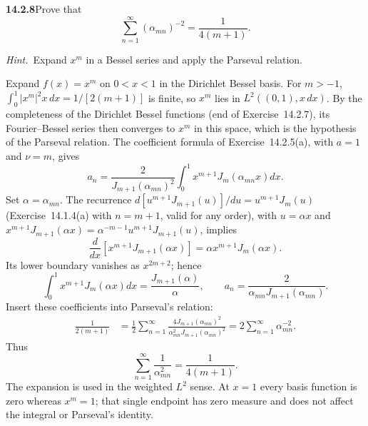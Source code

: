 \par\bigskip
\noindent\textbf{14.2.8}\quad Prove that
\[
\sum_{n=1}^{\infty}(\alpha_{mn})^{-2}=\frac{1}{4(m+1)}.
\]
\par\emph{Hint.}~Expand $x^{m}$ in a Bessel series and apply the
Parseval relation.
\par{}
\solution
Expand $f(x)=x^m$ on $0<x<1$ in the Dirichlet Bessel basis.
For $m>-1$, $\int_0^1|x^m|^2x\,dx=1/[2(m+1)]$ is finite, so $x^m$
lies in $L^2((0,1),x\,dx)$. By the completeness of the Dirichlet
Bessel functions (end of Exercise~14.2.7), its Fourier--Bessel series
then converges to $x^m$ in this space, which is the hypothesis of the
Parseval relation.
The coefficient formula of Exercise~14.2.5(a), with $a=1$ and
$\nu=m$, gives
\[
a_n=\frac{2}{J_{m+1}(\alpha_{mn})^2}
\int_0^1x^{m+1}J_m(\alpha_{mn}x)dx.
\]
Set $\alpha=\alpha_{mn}$. The recurrence
$d[u^{m+1}J_{m+1}(u)]/du=u^{m+1}J_m(u)$ (Exercise~14.1.4(a) with
$n=m+1$, valid for any order), with $u=\alpha x$ and
$x^{m+1}J_{m+1}(\alpha x)=\alpha^{-m-1}u^{m+1}J_{m+1}(u)$, implies
\[
\frac d{dx}[x^{m+1}J_{m+1}(\alpha x)]
=\alpha x^{m+1}J_m(\alpha x).
\]
Its lower boundary vanishes as $x^{2m+2}$; hence
\[
\int_0^1x^{m+1}J_m(\alpha x)dx
=\frac{J_{m+1}(\alpha)}\alpha,
\qquad a_n=\frac{2}{\alpha_{mn}J_{m+1}(\alpha_{mn})}.
\]
Insert these coefficients into Parseval's relation:
\begin{align*}
\frac1{2(m+1)}
&=\frac12\sum_{n=1}^{\infty}
\frac{4J_{m+1}(\alpha_{mn})^2}
{\alpha_{mn}^2J_{m+1}(\alpha_{mn})^2}
=2\sum_{n=1}^{\infty}\alpha_{mn}^{-2}.
\end{align*}
Thus
\[
\boxed{\sum_{n=1}^{\infty}\frac1{\alpha_{mn}^2}
=\frac1{4(m+1)}}.
\]
The expansion is used in the weighted $L^2$ sense. At $x=1$ every
basis function is zero whereas $x^m=1$; that single endpoint has
zero measure and does not affect the integral or Parseval's
identity.

